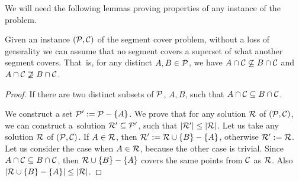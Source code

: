 We will need the following lemmas proving properties of any
instance of the problem.

\begin{lemma}
   \label{fpt_reduction}
   Given an instance $(\mathcal{P}, \mathcal{C})$ of the segment cover problem,
   without a loss of generality we can assume that
   no segment covers a superset of what another segment covers.
   That~is, for any distinct $A, B \in \mathcal{P}$, we have
   $A \cap \mathcal{C} \not \subseteq B \cap \mathcal{C}$ and $A \cap \mathcal{C} \not \supseteq B \cap \mathcal{C}$.
\end{lemma}   
   
\begin{proof} 
If there are two distinct subsets of $\mathcal{P}$,
$A, B$, such that $A \cap \mathcal{C} \subseteq B \cap \mathcal{C}$.

We construct a set $\mathcal{P}' := \mathcal{P} - \{A\}$.
We prove that for any solution $\mathcal{R}$ of $(\mathcal{P}, \mathcal{C})$,
we can construct a~solution $\mathcal{R}' \subseteq \mathcal{P}'$,
such that $|\mathcal{R}'| \le |\mathcal{R}|$.
Let us take any solution $\mathcal{R}$ of $(\mathcal{P}, \mathcal{C})$.
If $A \in \mathcal{R}$, then $\mathcal{R}' := \mathcal{R} \cup \{B\} - \{A\}$,
otherwise $\mathcal{R}' := \mathcal{R}$.
Let us consider the case when $A \in \mathcal{R}$,
because the other case is trivial.
Since $A \cap \mathcal{C} \subseteq B \cap \mathcal{C}$,
then $\mathcal{R} \cup \{B\} - \{A\}$
covers the same points from $\mathcal{C}$ as $\mathcal{R}$.
Also $|\mathcal{R} \cup \{B\} - \{A\}| \le |\mathcal{R}|$.
\end{proof}


